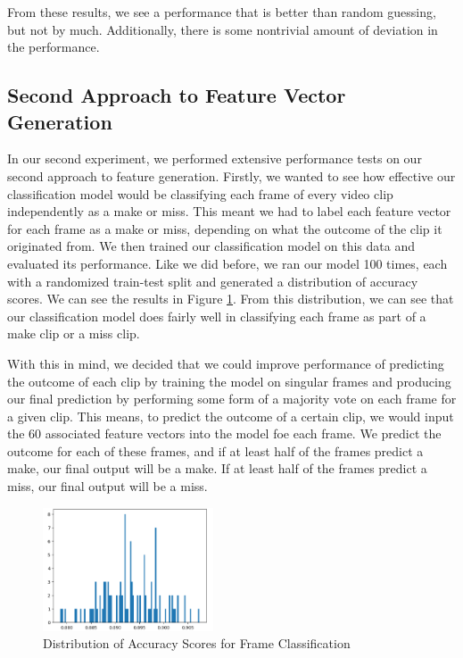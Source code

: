 \documentclass[10pt,twocolumn,letterpaper]{article}
\begin{document}
From these results, we see a performance that is better than random guessing, but not by much. Additionally, there is some 
nontrivial amount of deviation in the performance.

\subsection{Second Approach to Feature Vector Generation}
In our second experiment, we performed extensive performance tests on our second approach to feature generation. Firstly, we wanted
to see how effective our classification model would be classifying each frame of every video clip independently as a make or miss.
This meant we had to label each feature vector for each frame as a make or miss, depending on what the outcome of the clip it originated from.
We then trained our classification model on this data and evaluated its performance. Like we did before, we ran our model 100 times, each with a randomized train-test split
and generated a distribution of accuracy scores. We can see the results in Figure \ref{fig:frame_class_results}. From this distribution, we can see that our classification model
does fairly well in classifying each frame as part of a make clip or a miss clip. 

With this in mind, we decided that we could improve performance of predicting the outcome of each clip
by training the model on singular frames and producing our final prediction by performing some form of a majority vote on each frame for a given clip. This means, to predict the outcome of
a certain clip, we would input the 60 associated feature vectors into the model foe each frame. We predict the outcome for each of these frames, and if at least half of the frames
predict a make, our final output will be a make. If at least half of the frames predict a miss, our final output will be a miss. 

\begin{figure}
  \centering
  \includegraphics[width=0.45\textwidth]{imgs/frame_class_results.png}
  \caption{Distribution of Accuracy Scores for Frame Classification}
  \label{fig:frame_class_results}
\end{figure}
\end{document}
